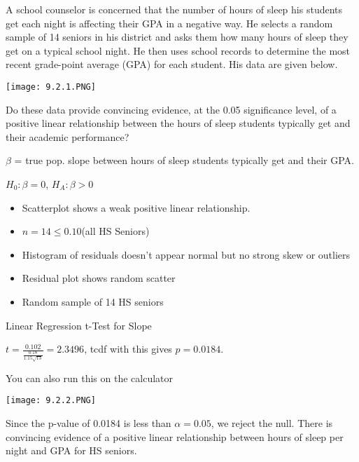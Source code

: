 \documentclass[../stats.tex]{subfiles}
\begin{document}
\pagebreak
\begin{example}
    A school counselor is concerned that the number of hours of sleep his students get each night is affecting their GPA in a negative way. He selects a random sample of 14 seniors in his district and asks them how many hours of sleep they get on a typical school night. 
    He then uses school records to determine the most recent grade-point average (GPA) for each student. His data are given below.

    \begin{center}
        \texttt{[image: 9.2.1.PNG]}
    \end{center}

    Do these data provide convincing evidence, at the 0.05 significance level, of a positive linear relationship between the hours of sleep students typically get and their academic performance?

    $\beta$ = true pop. slope between hours of sleep students typically get and their GPA.

    $H_0: \beta = 0$, $H_A: \beta >0$

    \begin{itemize}
        \item Scatterplot shows a weak positive linear relationship.
        \item $n=14\leq 0.10$(all HS Seniors)
        \item Histogram of residuals doesn't appear normal but no strong skew or outliers 
        \item Residual plot shows random scatter 
        \item Random sample of 14 HS seniors
    \end{itemize}

    Linear Regression t-Test for Slope 

    $t=\frac{0.102}{\frac{0.18}{1.15\sqrt{13}}}=2.3496$, tcdf with this gives $p=0.0184$.

    You can also run this on the calculator 
    \begin{center}
        \texttt{[image: 9.2.2.PNG]}
    \end{center}

    Since the p-value of 0.0184 is less than $\alpha = 0.05$, we reject the null. There is convincing evidence of a positive linear relationship between hours of sleep per night and GPA for HS seniors.
\end{example}
\end{document}

